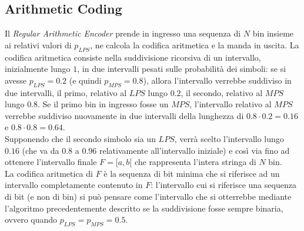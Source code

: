 \subsection{Arithmetic Coding}
Il \emph{Regular Arithmetic Encoder} prende in ingresso una sequenza di $N$ bin
insieme ai relativi valori di $p_{LPS}$, ne calcola la codifica aritmetica e la 
manda in uscita. La codifica aritmetica consiste nella suddivisione ricorsiva
di un intervallo, inizialmente lungo $1$, in due intervalli pesati sulle 
probabilità dei simboli: se si 
avesse $p_{LPS}=0.2$ (e quindi $p_{MPS}=0.8$), allora l'intervallo 
verrebbe suddiviso in due intervalli, il primo, relativo al $LPS$ lungo $0.2$, 
il secondo, relativo al $MPS$ lungo
$0.8$. Se il primo bin in ingresso fosse un $MPS$, l'intervallo relativo al 
$MPS$ 
verrebbe suddiviso nuovamente in due intervalli della lunghezza di 
$0.8\cdot0.2=0.16$ e $0.8\cdot0.8= 0.64$. \\
Supponendo che il secondo simbolo sia un $LPS$, verrà scelto l'intervallo lungo
$0.16$ (che va da $0.8$ a $0.96$ relativamente all'intervallo iniziale) e così 
via fino ad ottenere l'intervallo finale $F={[a,b[}$ che rappresenta l'intera 
stringa di $N$ bin. \\
La codifica aritmetica di $F$ è la sequenza di bit minima che si riferisce ad un
intervallo completamente contenuto in $F$: l'intervallo cui si riferisce una
sequenza di bit (e non di bin) si può pensare come l'intervallo che si
otterrebbe mediante l'algoritmo precedentemente descritto se la suddivisione
fosse sempre binaria, ovvero quando $p_{LPS} = p_{MPS} = 0.5$.
